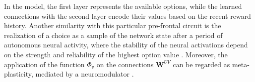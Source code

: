 In the model, the first layer represents the available options, while the learned connections with the second layer encode their values based on the recent reward history.
Another similarity with this particular pre-frontal circuit is the realization of a choice as a sample of the network state after a period of autonomous neural activity, where the stability of the neural activations depend on the strength and reliability of the highest option value \cite{backmanEffectsWorkingMemoryTraining2011, enelStableDynamicRepresentations2020}.
Moreover, the application of the function $\Phi_{v}$ on the connections $\textbf{W}^{UV}$ can be regarded as meta-plasticity, mediated by a neuromodulator \cite{wangMetalearningNaturalArtificial2021}.

